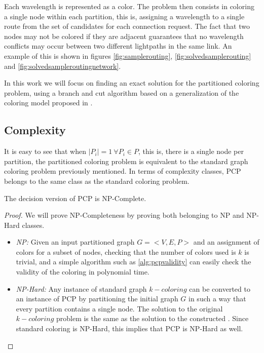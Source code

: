 \samplerouting

Each wavelength is represented as a color. The problem then consists in coloring a single node within each partition, this is, assigning a wavelength to a single route from the set of candidates for each connection request. The fact that two nodes may not be colored if they are adjacent guarantees  that no wavelength conflicts may occur between two different lightpaths in the same link. An example of this is shown in figures \ref{fig:samplerouting}, \ref{fig:solvedsamplerouting} and \ref{fig:solvedsampleroutingnetwork}.

In this work we will focus on finding an exact solution for the partitioned coloring problem, using a branch and cut algorithm based on a generalization of the coloring model proposed in \cite{mendez2006branch,mendez2008cutting}.

\subsection*{Complexity}

It is easy to see that when $|P_i| = 1\ \forall P_i \in P$, this is, there is a single node per partition, the partitioned coloring problem is equivalent to the standard graph coloring problem previously mentioned. In terms of complexity classes, PCP belongs to the same class as the standard coloring problem.

\begin{theorem}
The decision version of PCP is NP-Complete.
\end{theorem}

\begin{proof}
We will prove NP-Completeness by proving both belonging to NP and NP-Hard classes.

\begin{itemize}
\item{\textit{NP:} Given an input partitioned graph $G = <V,E,P>$ and an assignment of colors for a subset of nodes, checking that the number of colors used is $k$ is trivial, and a simple algorithm such as \ref{alg:pcpvalidity} can easily check the validity of the coloring in polynomial time.}
\item{\textit{NP-Hard:} Any instance of standard graph $k-coloring$ can be converted to an instance of PCP by partitioning the initial graph $G$ in such a way that every partition contains a single node. The solution to the original $k-coloring$ problem is the same as the solution to the constructed \PCP{}. Since standard coloring is NP-Hard, this implies that PCP is NP-Hard as well.}
\end{itemize}

\end{proof}


